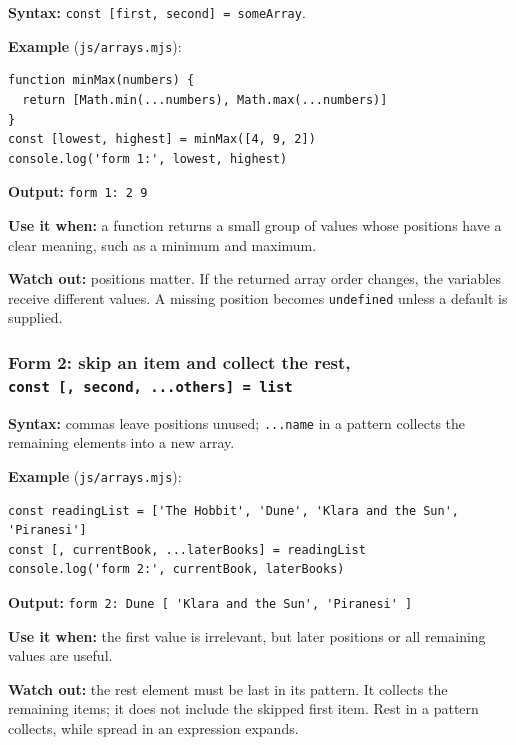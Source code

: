 \documentclass[
]{article}
\newcommand{\passthrough}[1]{#1}
\begin{document}
\textbf{Syntax:}
\passthrough{\lstinline!const [first, second] = someArray!}.

\textbf{Example} (\passthrough{\lstinline!js/arrays.mjs!}):

\begin{lstlisting}
function minMax(numbers) {
  return [Math.min(...numbers), Math.max(...numbers)]
}
const [lowest, highest] = minMax([4, 9, 2])
console.log('form 1:', lowest, highest)
\end{lstlisting}

\textbf{Output:} \passthrough{\lstinline!form 1: 2 9!}

\textbf{Use it when:} a function returns a small group of values whose
positions have a clear meaning, such as a minimum and maximum.

\textbf{Watch out:} positions matter. If the returned array order
changes, the variables receive different values. A missing position
becomes \passthrough{\lstinline!undefined!} unless a default is
supplied.

\subsubsection{\texorpdfstring{Form 2: skip an item and collect the
rest,
\texttt{const\ {[},\ second,\ ...others{]}\ =\ list}}{Form 2: skip an item and collect the rest, const {[}, second, ...others{]} = list}}\label{form-2-skip-an-item-and-collect-the-rest-const--second-others--list}

\textbf{Syntax:} commas leave positions unused;
\passthrough{\lstinline!...name!} in a pattern collects the remaining
elements into a new array.

\textbf{Example} (\passthrough{\lstinline!js/arrays.mjs!}):

\begin{lstlisting}
const readingList = ['The Hobbit', 'Dune', 'Klara and the Sun', 'Piranesi']
const [, currentBook, ...laterBooks] = readingList
console.log('form 2:', currentBook, laterBooks)
\end{lstlisting}

\textbf{Output:}
\passthrough{\lstinline!form 2: Dune [ 'Klara and the Sun', 'Piranesi' ]!}

\textbf{Use it when:} the first value is irrelevant, but later positions
or all remaining values are useful.

\textbf{Watch out:} the rest element must be last in its pattern. It
collects the remaining items; it does not include the skipped first
item. Rest in a pattern collects, while spread in an expression expands.
\end{document}
